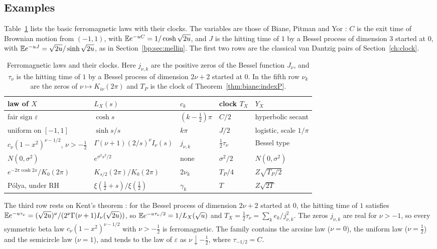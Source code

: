 \subsection{Examples}\label{fm:sec:examples}

Table~\ref{fm:tab:examples} lists the basic ferromagnetic laws with their clocks. The variables are those of Biane, Pitman and Yor \cite{BPY01}: $C$ is the exit time of Brownian motion from $(-1,1)$, with $\mathbb{E} e^{-uC}=1/\cosh\sqrt{2u}$, and $J$ is the hitting time of $1$ by a Bessel process of dimension $3$ started at $0$, with $\mathbb{E} e^{-uJ}=\sqrt{2u}/\sinh\sqrt{2u}$, as in Section~\ref{bp:sec:mellin}. The first two rows are the classical van Dantzig pairs of Section~\ref{ch:clock}.

\begin{table}[htbp]
\centering\small\setlength{\tabcolsep}{4.5pt}
\begin{tabular}{@{}lllll@{}}
\toprule
law of $X$ & $L_X(s)$ & $c_k$ & clock $T_X$ & $Y_X$\\
\midrule
fair sign $\varepsilon$ & $\cosh s$ & $(k-\frac12)\pi$ & $C/2$ & hyperbolic secant\\
uniform on $[-1,1]$ & $\sinh s/s$ & $k\pi$ & $J/2$ & logistic, scale $1/\pi$\\
$c_\nu(1-x^2)^{\nu-1/2}$, $\nu>-\frac12$ & $\Gamma(\nu+1)(2/s)^\nu I_\nu(s)$ & $j_{\nu,k}$ & $\frac12\tau_\nu$ & Bessel type\\
$N(0,\sigma^2)$ & $e^{\sigma^2s^2/2}$ & none & $\sigma^2/2$ & $N(0,\sigma^2)$\\
$e^{-2\pi\cosh2x}/K_0(2\pi)$ & $K_{s/2}(2\pi)/K_0(2\pi)$ & $2\nu_k$ & $T_P/4$ & $Z\sqrt{T_P/2}$\\
P\'olya, under RH & $\xi(\frac12+s)/\xi(\frac12)$ & $\gamma_k$ & $T$ & $Z\sqrt{2T}$\\
\bottomrule
\end{tabular}
\caption{Ferromagnetic laws and their clocks. Here $j_{\nu,k}$ are the positive zeros of the Bessel function $J_\nu$, and $\tau_\nu$ is the hitting time of $1$ by a Bessel process of dimension $2\nu+2$ started at $0$. In the fifth row $\nu_k$ are the zeros of $\nu\mapsto K_{i\nu}(2\pi)$ and $T_P$ is the clock of Theorem~\ref{thm:biane:indexP}.}
\label{fm:tab:examples}
\end{table}

The third row rests on Kent's theorem \cite{Kent78}: for the Bessel process of dimension $2\nu+2$ started at $0$, the hitting time of $1$ satisfies $\mathbb{E} e^{-u\tau_\nu}=(\sqrt{2u})^\nu/(2^\nu\Gamma(\nu+1)I_\nu(\sqrt{2u}))$, so $\mathbb{E} e^{-u\tau_\nu/2}=1/L_X(\sqrt u)$ and $T_X=\frac12\tau_\nu=\sum_ke_k/j_{\nu,k}^2$. The zeros $j_{\nu,k}$ are real for $\nu>-1$, so every symmetric beta law $c_\nu(1-x^2)^{\nu-1/2}$ with $\nu>-\frac12$ is ferromagnetic. The family contains the arcsine law ($\nu=0$), the uniform law ($\nu=\frac12$) and the semicircle law ($\nu=1$), and tends to the law of $\varepsilon$ as $\nu\downarrow-\frac12$, where $\tau_{-1/2}=C$.


